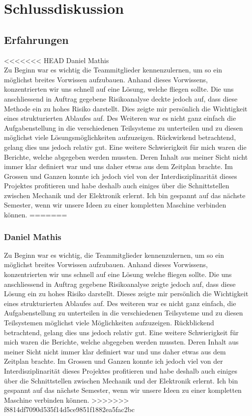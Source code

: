 \section{Schlussdiskussion}

\subsection{Erfahrungen}

<<<<<<< HEAD
Daniel Mathis\\
Zu Beginn war es wichtig die Teammitglieder kennenzulernen, um so ein möglichst breites Vorwissen aufzubauen. Anhand dieses Vorwissens, konzentrierten wir uns schnell auf eine Lösung, welche fliegen sollte. Die uns anschliessend in Auftrag gegebene Risikoanalyse deckte jedoch auf, dass diese Methode ein zu hohes Risiko darstellt. Dies zeigte mir persönlich die Wichtigkeit eines strukturierten Ablaufes auf. Des Weiteren war es nicht ganz einfach die Aufgabenstellung in die verschiedenen Teilsysteme zu unterteilen und zu diesen möglichst viele Lösungsmöglichkeiten aufzuzeigen. Rückwirkend betrachtend, gelang dies uns jedoch relativ gut. Eine weitere Schwierigkeit für mich waren die Berichte, welche abgegeben werden mussten. Deren Inhalt aus meiner Sicht nicht immer klar definiert war und uns daher etwas aus dem Zeitplan brachte. Im Grossen und Ganzen konnte ich jedoch viel von der Interdisziplinarität dieses Projektes profitieren und habe deshalb auch einiges über die Schnittstellen zwischen Mechanik und der Elektronik erlernt. Ich bin gespannt auf das nächste Semester, wenn wir unsere Ideen zu einer kompletten Maschine verbinden können.
=======
\subsubsection*{Daniel Mathis}
Zu Beginn war es wichtig, die Teammitglieder kennenzulernen, um so ein 
möglichst breites Vorwissen aufzubauen. Anhand dieses Vorwissens, 
konzentrierten wir uns schnell auf eine Lösung welche fliegen sollte. Die uns 
anschliessend in Auftrag gegebene Risikoanalyse zeigte jedoch auf, dass diese 
Lösung ein zu hohes Risiko darstellt. Dieses zeigte mir persönlich die 
Wichtigkeit eines strukturierten Ablaufes auf. Des weiteren war es nicht ganz 
einfach, die Aufgabenstellung zu unterteilen in die verschiedenen Teilsysteme 
und zu diesen Teilsystemen möglichst viele Möglichkeiten aufzuzeigen. 
Rückblickend betrachtend, gelang dies uns jedoch relativ gut. Eine weitere 
Schwierigkeit für mich waren die Berichte, welche abgegeben werden mussten. 
Deren Inhalt aus meiner Sicht nicht immer klar definiert war und uns daher 
etwas aus dem Zeitplan brachte. Im Grossen und Ganzen konnte ich jedoch viel 
von der Interdisziplinarität dieses Projektes profitieren und habe deshalb 
auch einiges über die Schnittstellen zwischen Mechanik und der Elektronik 
erlernt. Ich bin gespannt auf das nächste Semester, wenn wir unsere Ideen zu 
einer kompletten Maschine verbinden können.
>>>>>>> f8814df7090d535f14d5ce9851f1882ea5fac2bc

